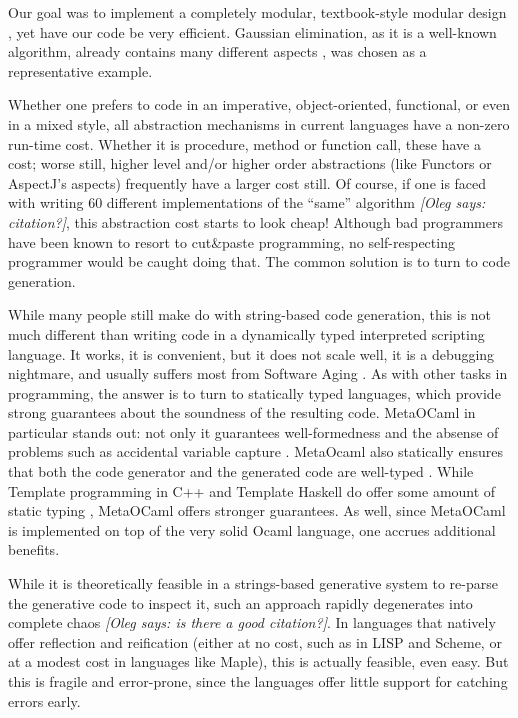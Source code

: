 \documentclass{llncs}
\newcommand{\oleg}[1]{{\it [Oleg says: #1]}}
\begin{document}
Our goal was to implement a completely modular, textbook-style 
modular design \cite{journals/cacm/parnas72a}, yet 
have our code be very efficient.  Gaussian elimination, as it is a  
well-known algorithm, already contains many different aspects 
\cite{carette04}, was chosen as a representative example.

Whether one prefers to code in an imperative, object-oriented, functional, 
or even in a mixed style, all abstraction mechanisms in current
languages have a non-zero run-time cost.  Whether it is procedure,
method or function call, these have a cost; worse still, higher level
and/or higher order abstractions (like Functors or AspectJ's aspects)
frequently have a larger cost still.  Of course, if one is faced with
writing 60 different implementations of the ``same'' algorithm
\oleg{citation?}, this
abstraction cost starts to look cheap!  Although bad programmers have
been known to resort to cut\&paste programming, no self-respecting
programmer would be caught doing that.
The common solution is to turn to code generation.

While many people still make do with string-based code generation,
this is not much different than writing code in a dynamically typed
interpreted scripting language.  It works, it is convenient, but it
does not scale well, it is a debugging nightmare, and usually suffers
most from Software Aging \cite{parnas_aging}.  As with other tasks in
programming, the answer is to turn to statically typed languages,
which provide strong guarantees about the soundness of the resulting
code.  MetaOCaml \cite{CTHL03,metaocaml-org} in particular stands
out: not only it guarantees well-formedness and the absense of problems 
such as accidental variable capture \cite{HygienicMacros}. MetaOcaml also
statically ensures that both the code generator and the generated code
are well-typed \cite{TahaSheard97,TahaThesis}.  While Template
programming in C++ and Template Haskell do offer some amount of static
typing \cite{conf/dagstuhl/CzarneckiOST03}, MetaOCaml
offers stronger guarantees.  As well, since MetaOCaml is
implemented on top of the very solid Ocaml language, one accrues
additional benefits.

While it is theoretically feasible in a strings-based
generative system to re-parse the generative code to inspect it, such
an approach rapidly degenerates into complete chaos \oleg{is there a
  good citation?}.  In languages
that natively offer reflection and reification (either at no cost, 
such as in LISP and Scheme, or at a modest cost in languages like 
Maple), this is actually feasible, even easy.  But this is fragile
and error-prone, since the languages offer little support for catching
errors early.
\end{document}
